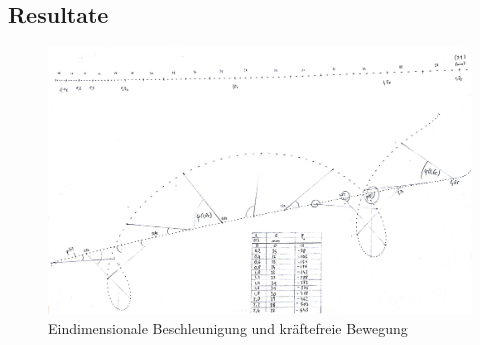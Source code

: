 \documentclass[12pt,a4paper]{article}
\begin{document}
\begin{multicols}{2}
%

\end{multicols}

\subsection{Resultate}




\begin{figure}[H]
	\centering
	\includegraphics[scale=0.25, angle=-90]{./figure/bewegungen.jpg}
	\caption{Eindimensionale Beschleunigung und kräftefreie Bewegung}
	\label{fig:bewegungen}
\end{figure}
\end{document}
